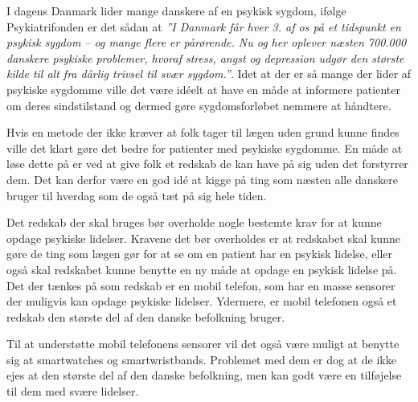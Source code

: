 


I dagens Danmark lider mange danskere af en psykisk sygdom, ifølge Psykiatrifonden er det sådan at \textit{''I Danmark får hver 3. af os på et tidspunkt en psykisk sygdom – og mange flere er pårørende. 
Nu og her oplever næsten 700.000 danskere psykiske problemer, hvoraf stress, angst og depression udgør den største kilde til alt fra dårlig trivsel til svær sygdom.''}\cite{psykiatrifonden}.
Idet at der er så mange der lider af psykiske sygdomme ville det være idéelt at have en måde at informere patienter om deres sindstilstand og dermed gøre sygdomsforløbet nemmere at håndtere.

Hvis en metode der ikke kræver at folk tager til lægen uden grund kunne findes ville det klart gøre det bedre for patienter med psykiske sygdomme.
En måde at løse dette på er ved at give folk et redskab de kan have på sig uden det forstyrrer dem. 
Det kan derfor være en god idé at kigge på ting som næsten alle danskere bruger til hverdag som de også tæt på sig hele tiden.

Det redskab der skal bruges bør overholde nogle bestemte krav for at kunne opdage psykiske lidelser.
Kravene det bør overholdes er at redskabet skal kunne gøre de ting som lægen gør for at se om en patient har en psykisk lidelse, eller også skal redskabet kunne benytte en ny måde at opdage en psykisk lidelse på.
Det der tænkes på som redskab er en mobil telefon, som har en masse sensorer der muligvis kan opdage psykiske lidelser. 
Ydermere, er mobil telefonen også et redskab den største del af den danske befolkning bruger.

Til at understøtte mobil telefonens sensorer vil det også være muligt at benytte sig at smartwatches og smartwristbands.
Problemet med dem er dog at de ikke ejes at den største del af den danske befolkning, men kan godt være en tilføjelse til dem med svære lidelser.

